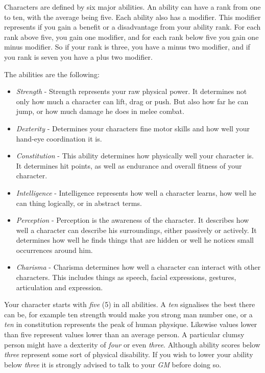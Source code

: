 Characters are defined by six major abilities. An ability can have a rank from
one to ten, with the average being five. Each ability also has a modifier. This
modifier represents if you gain a benefit or a disadvantage from your ability
rank. For each rank above five, you gain one modifier, and for each rank below
five you gain one minus modifier. So if your rank is three, you have a minus
two modifier, and if you rank is seven you have a plus two modifier.

The abilities are the following:

\begin{itemize}
\item \emph{Strength} - Strength represents your raw physical power. It
  determines not only how much a character can lift, drag or push. But also how
  far he can jump, or how much damage he does in melee combat.
\item \emph{Dexterity} - Determines your characters fine motor skills and how
  well your hand-eye coordination it is.
\item \emph{Constitution} - This ability determines how physically well your
  character is. It determines hit points, as well as endurance and overall
  fitness of your character.
\item \emph{Intelligence} - Intelligence represents how well a character learns,
  how well he can thing logically, or in abstract terms.
\item \emph{Perception} - Perception is the awareness of the character. It
  describes how well a character can describe his surroundings, either passively
  or actively. It determines how well he finds things that are hidden or
  well he notices small occurrences around him.
\item \emph{Charisma} - Charisma determines how well a character can interact
  with other characters. This includes things as speech, facial expressions,
  gestures, articulation and expression.
\end{itemize}

Your character starts with \emph{five} (5) in all abilities. A \emph{ten}
signalises the best there can be, for example ten strength would make you
strong man number one, or a \emph{ten} in constitution represents the peak of
human physique. Likewise values lower than five represent values lower than an
average person. A particular clumsy person might have a dexterity of
\emph{four} or even \emph{three}. Although ability scores below \emph{three}
represent some sort of physical disability. If you wish to lower your ability
below \emph{three} it is strongly advised to talk to your \emph{GM} before
doing so.

